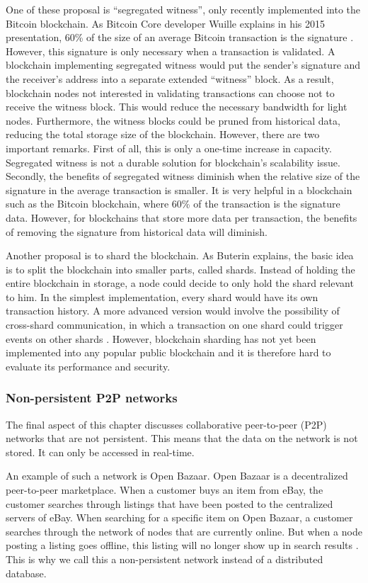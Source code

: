 One of these proposal is ``segregated witness'', only recently implemented into the Bitcoin blockchain. As Bitcoin Core developer Wuille explains in his 2015 presentation, 60\% of the size of an average Bitcoin transaction is the signature \cite{segregated-witness}. However, this signature is only necessary when a transaction is validated. A blockchain implementing segregated witness would put the sender's signature and the receiver's address into a separate extended ``witness'' block. As a result, blockchain nodes not interested in validating transactions can choose not to receive the witness block. This would reduce the necessary bandwidth for light nodes. Furthermore, the witness blocks could be pruned from historical data, reducing the total storage size of the blockchain. However, there are two important remarks. First of all, this is only a one-time increase in capacity. Segregated witness is not a durable solution for blockchain's scalability issue. Secondly, the benefits of segregated witness diminish when the relative size of the signature in the average transaction is smaller. It is very helpful in a blockchain such as the Bitcoin blockchain, where 60\% of the transaction is the signature data. However, for blockchains that store more data per transaction, the benefits of removing the signature from historical data will diminish.

Another proposal is to shard the blockchain. As Buterin explains, the basic idea is to split the blockchain into smaller parts, called shards. Instead of holding the entire blockchain in storage, a node could decide to only hold the shard relevant to him. In the simplest implementation, every shard would have its own transaction history. A more advanced version would involve the possibility of cross-shard communication, in which a transaction on one shard could trigger events on other shards \cite{blockchain-sharding}. However, blockchain sharding has not yet been implemented into any popular public blockchain and it is therefore hard to evaluate its performance and security.

\subsubsection{Non-persistent P2P networks}

The final aspect of this chapter discusses collaborative peer-to-peer (P2P) networks that are not persistent. This means that the data on the network is not stored. It can only be accessed in real-time. 

An example of such a network is Open Bazaar. Open Bazaar is a decentralized peer-to-peer marketplace. When a customer buys an item from eBay, the customer searches through listings that have been posted to the centralized servers of eBay. When searching for a specific item on Open Bazaar, a customer searches through the network of nodes that are currently online. But when a node posting a listing goes offline, this listing will no longer show up in search results \cite{openbazaar-faq}. This is why we call this a non-persistent network instead of a distributed database. 

